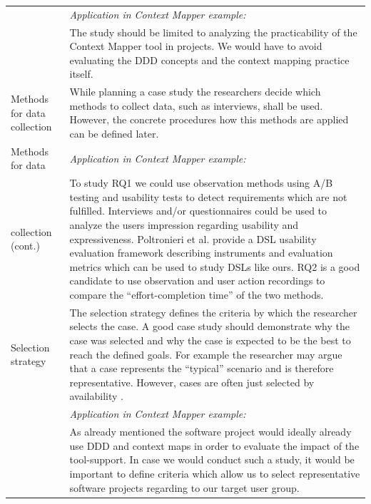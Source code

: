 \documentclass[runningheads]{llncs}
\begin{document}
\begin{tabularx}{\textwidth}{ p{3.0cm} X }
	\RaggedRight & \RaggedRight \textit{Application in Context Mapper example:} \\
	\RaggedRight & \RaggedRight The study should be limited to analyzing the practicability of the Context Mapper tool in projects. We would have to avoid evaluating the DDD concepts and the context mapping practice itself. \\
	\hline
	\RaggedRight Methods for data collection & \RaggedRight While planning a case study the researchers decide which methods to collect data, such as interviews, shall be used. However, the concrete procedures how this methods are applied can be defined later. \\
	\hline
	\RaggedRight Methods for data & \RaggedRight \textit{Application in Context Mapper example:} \\
	\RaggedRight collection (cont.) & \RaggedRight To study RQ1 we could use observation methods using A/B testing and usability tests to detect requirements which are not fulfilled. Interviews and/or questionnaires could be used to analyze the users impression regarding usability and expressiveness. Poltronieri et al. \cite{Poltronieri:2018:UEF:3284971.3284973} provide a DSL usability evaluation framework describing instruments and evaluation metrics which can be used to study DSLs like ours. RQ2 is a good candidate to use observation and user action recordings to compare the ``effort-completion time'' \cite{Poltronieri:2018:UEF:3284971.3284973} of the two methods. \\
	\hline	
	\RaggedRight Selection strategy & \RaggedRight The selection strategy defines the criteria by which the researcher selects the case. A good case study should demonstrate why the case was selected and why the case is expected to be the best to reach the defined goals. For example the researcher may argue that a case represents the ``typical'' scenario and is therefore representative. However, cases are often just selected by availability \cite{Benbasat:1987:CRS:35194.35201}. \\
	\RaggedRight & \RaggedRight \textit{Application in Context Mapper example:} \\
	\RaggedRight & \RaggedRight As already mentioned the software project would ideally already use DDD and context maps in order to evaluate the impact of the tool-support. In case we would conduct such a study, it would be important to define criteria which allow us to select representative software projects regarding to our target user group. \\
	\hline
\end{tabularx}
\end{document}
